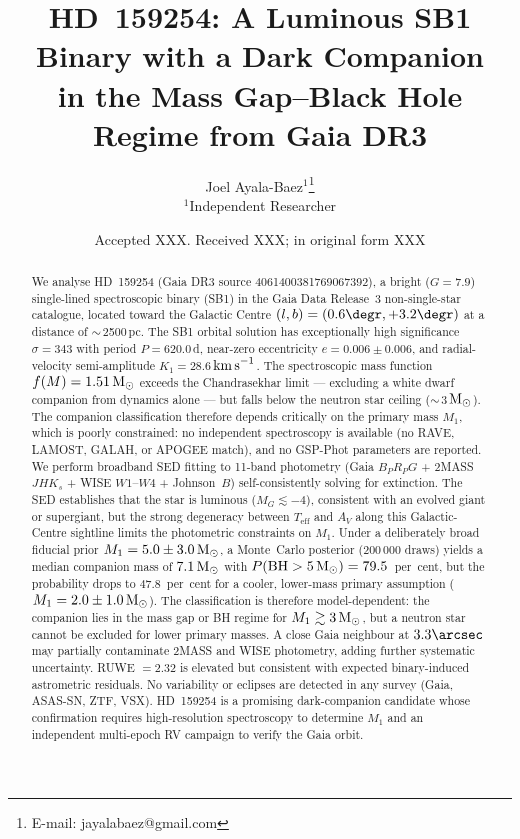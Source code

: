 \documentclass[usenatbib,fleqn]{mnras}
\title[HD~159254: SB1 with Dark Companion toward the Galactic Centre]
{HD~159254: A Luminous SB1 Binary with a Dark Companion\\
 in the Mass Gap--Black Hole Regime from Gaia DR3}
\author[J. Ayala-Baez]{
  Joel Ayala-Baez$^{1}$\thanks{E-mail: jayalabaez@gmail.com}\\
  $^{1}$Independent Researcher
}
\date{Accepted XXX. Received XXX; in original form XXX}
\newcommand{\Msun}{{\rm M}_\odot}
\newcommand{\kms}{{\rm km\,s}^{-1}}
\newcommand{\fmass}{f(M)}
\begin{document}
\label{firstpage}
\pagerange{\pageref{firstpage}--\pageref{LastPage}}
\maketitle

\begin{abstract}
We analyse HD~159254 (Gaia DR3 source 4061400381769067392), a
bright ($G = 7.9$) single-lined spectroscopic binary (SB1) in
the Gaia Data Release~3 non-single-star catalogue, located toward
the Galactic Centre $(l, b) = (0.6\degr, +3.2\degr)$ at a
distance of $\sim$\,2500\,pc.  The SB1 orbital solution has
exceptionally high significance $\sigma = 343$ with period
$P = 620.0$\,d, near-zero eccentricity $e = 0.006 \pm 0.006$,
and radial-velocity semi-amplitude $K_1 = 28.6$\,$\kms$.  The
spectroscopic mass function $\fmass = 1.51\,\Msun$ exceeds the
Chandrasekhar limit --- excluding a white dwarf companion from
dynamics alone --- but falls below the neutron star ceiling
($\sim$\,3\,$\Msun$).  The companion classification therefore
depends critically on the primary mass $M_1$, which is poorly
constrained: no independent spectroscopy is available (no RAVE,
LAMOST, GALAH, or APOGEE match), and no GSP-Phot parameters are
reported.  We perform broadband SED fitting to 11-band photometry
(Gaia $B_P R_P G$ + 2MASS $JHK_s$ + WISE $W1$--$W4$ +
Johnson~$B$) self-consistently solving for extinction.  The SED
establishes that the star is luminous ($M_G \lesssim -4$),
consistent with an evolved giant or supergiant, but the strong
degeneracy between $T_\mathrm{eff}$ and $A_V$ along this
Galactic-Centre sightline limits the photometric constraints on
$M_1$.  Under a deliberately broad fiducial prior
$M_1 = 5.0 \pm 3.0\,\Msun$, a Monte~Carlo posterior (200\,000
draws) yields a median companion mass of $7.1\,\Msun$ with
$P(\text{BH} > 5\,\Msun) = 79.5$~per~cent, but the probability
drops to $47.8$~per~cent for a cooler, lower-mass primary
assumption ($M_1 = 2.0 \pm 1.0\,\Msun$).  The classification is
therefore model-dependent: the companion lies in the mass gap or
BH regime for $M_1 \gtrsim 3\,\Msun$, but a neutron star cannot
be excluded for lower primary masses.  A close Gaia neighbour at
$3.3\arcsec$ may partially contaminate 2MASS and WISE photometry,
adding further systematic uncertainty.  RUWE $= 2.32$ is elevated
but consistent with expected binary-induced astrometric residuals.
No variability or eclipses are detected in any survey (Gaia,
ASAS-SN, ZTF, VSX).  HD~159254 is a promising dark-companion
candidate whose confirmation requires high-resolution spectroscopy
to determine $M_1$ and an independent multi-epoch RV campaign to
verify the Gaia orbit.
\end{abstract}
\end{document}
